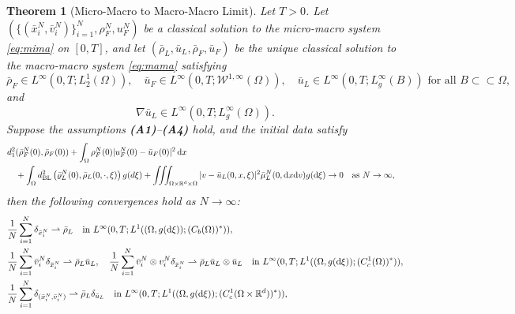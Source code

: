 \documentclass[10pt, reqno]{amsart}
\newtheorem{theorem}{Theorem}[section]
\theoremstyle{definition}
\theoremstyle{remark}
\numberwithin{equation}{section}
\newcommand{\dx}{\textnormal{d}x}
\newcommand{\dv}{\textnormal{d}v}
\newcommand{\dxi}{\textnormal{d}\xi}
\newcommand{\calW}{\mathcal W}
\newcommand{\R}{\mathbb{R}}
\newcommand{\weakto}{\rightharpoonup}
\begin{document}
\begin{theorem}[Micro-Macro to Macro-Macro Limit]\label{thm:mima-mama}
    Let $T>0$. Let $(\{(\bar{x}^N_i, \bar{v}^N_i) \}_{i=1}^N, \rho_F^N, u_F^N)$ be a classical solution to the micro-macro system \eqref{eq:mima} on $[0,T]$, and let $(\bar \rho_L, \bar u_L, \bar\rho_F, \bar u_F)$ be the unique classical solution to the macro-macro system \eqref{eq:mama} satisfying 
    \[
    \bar \rho_F \in L^\infty(0,T; L^1_2(\Omega)), \quad \bar u_F \in L^\infty(0,T;\calW^{1,\infty}(\Omega)), \quad \bar u_L \in L^\infty(0,T; L^\infty_{g}(B)) \mbox{ for all } B \subset \subset \Omega, 
    \]
    and 
    \[
    \nabla \bar u_L \in L^\infty(0,T;L^\infty_g(\Omega)).
    \]
Suppose the assumptions {\bf (A1)}--{\bf (A4)} hold, and the initial data satisfy
    \begin{align*}
&    d_1^2(\bar\rho^N_F(0), \bar\rho_F(0)) + \int_{\Omega} \rho^N_F(0) | u^N_F(0) - \bar u_F(0)|^2\, \dx \cr
&\quad + \int_{\Omega} d_{\rm BL}^2\left( \bar\varrho^N_L(0), \bar\rho_L(0,\cdot,\xi)\right)g(d\xi) + \iiint_{\Omega \times \R^d \times \Omega} |v - \bar u_L(0,x,\xi)|^2 \bar\mu_{L}^N(0,\dx\dv) g(\dxi)  \to 0 \quad \mbox{as } N \to \infty, 
    \end{align*}
    then the following convergences hold as $N \to \infty$:
\[%
    \begin{split}
        &\frac{1}{N}\sum_{i=1}^N \delta_{\bar x_i^N} \weakto \bar \rho_L  \quad \text{in }  L^\infty(0,T; L^1((\Omega,g(\dxi));(C_b(\Omega))^*)), \\ %
        &\frac{1}{N}\sum_{i=1}^N \bar v_i^N \delta_{\bar x_i^N} \weakto \bar \rho_L \bar u_L, \quad \frac{1}{N}\sum_{i=1}^N \bar v_i^N \otimes v_i^N \delta_{\bar x_i^N} \weakto \bar \rho_L \bar u_L \otimes \bar u_L  \quad \text{in }  L^\infty(0,T; L^1((\Omega,g(\dxi)) ; (C_c^1(\Omega))^*)), \\ %
                &\frac{1}{N}\sum_{i=1}^N  \delta_{(\bar x_i^N, \bar v_i^N)} \weakto \bar \rho_L  \delta_{\bar u_L} \quad \text{in }  L^\infty(0,T; L^1((\Omega,g(\dxi)) ; (C_c^1(\Omega \times \R^d))^*)), \\

\end{split}\]
\end{theorem}
\end{document}
